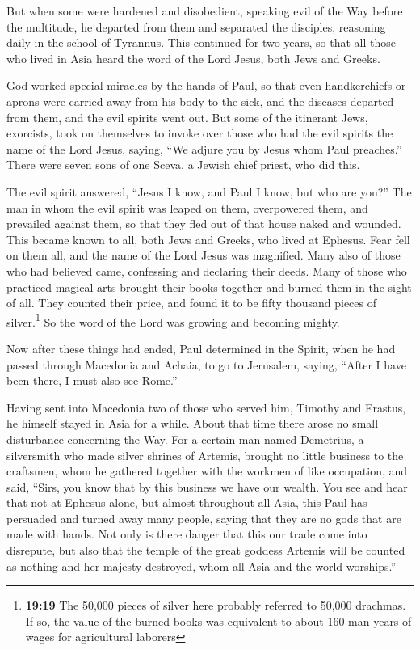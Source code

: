  But when some were hardened and disobedient, speaking
evil of the Way before the multitude, he departed from them and
separated the disciples, reasoning daily in the school of Tyrannus.
 This continued for two years, so that all those who
lived in Asia heard the word of the Lord Jesus, both Jews and Greeks.

 God worked special miracles by the hands of Paul,
 so that even handkerchiefs or aprons were carried away
from his body to the sick, and the diseases departed from them, and the
evil spirits went out.  But some of the itinerant Jews,
exorcists, took on themselves to invoke over those who had the evil
spirits the name of the Lord Jesus, saying, ``We adjure you by Jesus
whom Paul preaches.''  There were seven sons of one
Sceva, a Jewish chief priest, who did this.

 The evil spirit answered, ``Jesus I know, and Paul I
know, but who are you?''  The man in whom the evil spirit
was leaped on them, overpowered them, and prevailed against them, so
that they fled out of that house naked and wounded.  This
became known to all, both Jews and Greeks, who lived at Ephesus. Fear
fell on them all, and the name of the Lord Jesus was magnified.
 Many also of those who had believed came, confessing and
declaring their deeds.  Many of those who practiced
magical arts brought their books together and burned them in the sight
of all. They counted their price, and found it to be fifty thousand
pieces of silver.\footnote{\textbf{19:19} The 50,000 pieces of silver
  here probably referred to 50,000 drachmas. If so, the value of the
  burned books was equivalent to about 160 man-years of wages for
  agricultural laborers}  So the word of the Lord was
growing and becoming mighty.

 Now after these things had ended, Paul determined in the
Spirit, when he had passed through Macedonia and Achaia, to go to
Jerusalem, saying, ``After I have been there, I must also see Rome.''

 Having sent into Macedonia two of those who served him,
Timothy and Erastus, he himself stayed in Asia for a while.
 About that time there arose no small disturbance
concerning the Way.  For a certain man named Demetrius, a
silversmith who made silver shrines of Artemis, brought no little
business to the craftsmen,  whom he gathered together
with the workmen of like occupation, and said, ``Sirs, you know that by
this business we have our wealth.  You see and hear that
not at Ephesus alone, but almost throughout all Asia, this Paul has
persuaded and turned away many people, saying that they are no gods that
are made with hands.  Not only is there danger that this
our trade come into disrepute, but also that the temple of the great
goddess Artemis will be counted as nothing and her majesty destroyed,
whom all Asia and the world worships.''

